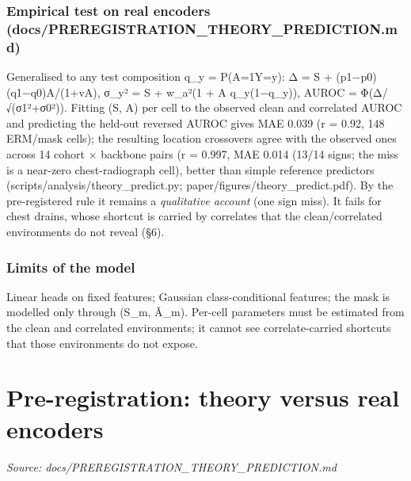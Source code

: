 {\subsubsection{Empirical test on real encoders (docs/PREREGISTRATION\_THEORY\_PREDICTION.md)}\label{empirical-test-on-real-encoders-docspreregistration_theory_predictionmd}

Generalised to any test composition q\_y = P(A=1\textbar Y=y): Δ = S + (p1−p0)(q1−q0)A/(1+vA), σ\_y² = S + w\_a²(1 + A q\_y(1−q\_y)),
AUROC = Φ(Δ/√(σ1²+σ0²)). Fitting (S, A) per cell to the observed clean and correlated AUROC and predicting the held-out
reversed AUROC gives MAE 0.039 (r = 0.92, 148 ERM/mask cells); the resulting location crossovers agree with the
observed ones across 14 cohort × backbone pairs (r = 0.997, MAE 0.014 (13/14 signs; the miss is a near-zero chest-radiograph cell), better
than simple reference predictors (scripts/analysis/theory\_predict.py; paper/figures/theory\_predict.pdf). By the
pre-registered rule it remains a \emph{qualitative account} (one sign miss). It fails for chest drains, whose shortcut is
carried by correlates that the clean/correlated environments do not reveal (§6).

\subsubsection{Limits of the model}\label{limits-of-the-model}

Linear heads on fixed features; Gaussian class-conditional features; the mask is modelled only through (S\_m, Ã\_m).
Per-cell parameters must be estimated from the clean and correlated environments; it cannot see correlate-carried
shortcuts that those environments do not expose.

}

\section{Pre-registration: theory versus real encoders}\label{doc:PREREGISTRATION_THEORY_PREDICTION}
\noindent\textit{Source: docs/PREREGISTRATION\_THEORY\_PREDICTION.md}

